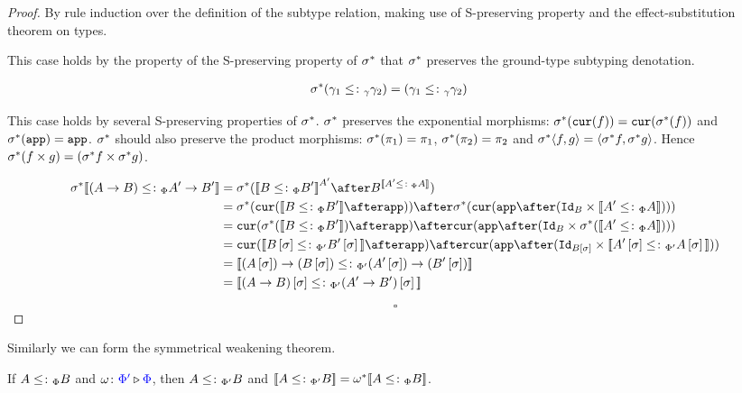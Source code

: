 \documentclass{Report}
\begin{document}
\begin{proof}
    By rule induction over the definition of the subtype relation, making use of S-preserving property and the effect-substitution theorem on types.


This case holds by the property of the S-preserving property of $\sigma^*$ that $\sigma^*$ preserves the ground-type subtyping denotation.

\begin{align*}
    \sigma^*(\gamma_1\leq\colon_\gamma\gamma_2) &= (\gamma_1\leq\colon_\gamma\gamma_2)
\end{align*}




This case holds by several S-preserving properties of $\sigma^*$. $\sigma^*$ preserves the exponential morphisms: $\sigma^*(\texttt{cur}(f)) = \texttt{cur}(\sigma^*(f))$ and $\sigma^*(\texttt{app}) = \texttt{app}$. $\sigma^*$ should also preserve the product morphisms: $\sigma^*(\pi_1) = \pi_1$, $\sigma^*(\pi_2) = \pi_2$ and $\sigma^*\langle f, g\rangle = \langle\sigma^* f, \sigma^* g\rangle$. Hence $\sigma^*(f \times g) = (\sigma^* f \times \sigma^* g)$.

\begin{align*}
    \si\star\deno{(\ab)\subtypep\fntype{A'}{B'}} &= \si\star(\deno{B\subtypep B'}^{A'}\after B^{\deno{A'\subtypep A}})\\
    &= \si\star(\cur{\deno{B\subtypep B'}\after\app})\after\si\star(\cur{\app\after(\Id{B}\times\deno{A'\subtypep A})})\\
    & = \cur{\si\star(\deno{B\subtypep B'})\after\app}\after\cur{\app\after(\Id{B}\times\si\star(\deno{A'\subtypep A}))}\\
    & = \cur{\deno{B\ssi\subtypepp B'\ssi}\after\app}\after\cur{\app\after(\Id{B\ssi}\times\deno{A'\ssi\subtypepp A\ssi})}\\
    &= \deno{\fntype{(A\ssi)}{(B\ssi)}\subtypepp\fntype{(A'\ssi)}{(B'\ssi)}}\\
    &= \deno{(\ab)\ssi\subtypepp(\fntype{A'}{B'})\ssi}
\end{align*}


$$\square$$
\end{proof}


Similarly we can form the symmetrical weakening theorem.

\begin{theorem}
    If $A \leq\colon_\Phi B$ and $\omega \colon {\color{blue}\Phi'} \triangleright {\color {blue} \Phi}$, then $A \leq\colon_{\Phi'} B$ and ${\bf [\![}A\leq\colon_{\Phi'} B{\bf ]\!]} = \omega^*{\bf [\![}A\leq\colon_\Phi B{\bf ]\!]}$.
\end{theorem}
\end{document}
